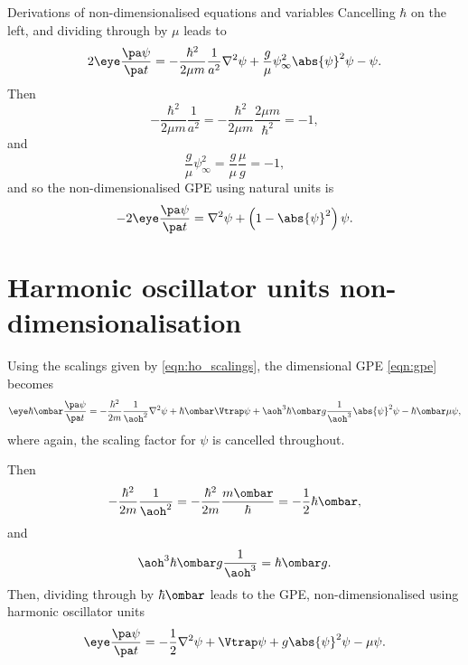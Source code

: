 \begin{chapter}{\label{cha:nondim}Derivations of non-dimensionalised equations
and variables}
  Cancelling $\hbar$ on the left, and dividing through by $\mu$ leads to
  \begin{equation*}
    2\eye \frac{\pa \psi}{\pa t} = -\frac{\hbar^{2}}{2\mu m} \frac{1}{a^{2}}
    \nabla^{2} \psi + \frac{g}{\mu} \psi_{\infty}^{2} \abs{\psi}^{2} \psi -
    \psi.
  \end{equation*}
  Then
  \begin{equation*}
    -\frac{\hbar^{2}}{2\mu m} \frac{1}{a^{2}} = -\frac{\hbar^{2}}{2\mu m}
    \frac{2\mu m}{\hbar^{2}} = -1,
  \end{equation*}
  and
  \begin{equation*}
    \frac{g}{\mu} \psi_{\infty}^{2} = \frac{g}{\mu} \frac{\mu}{g} = -1,
  \end{equation*}
  and so the non-dimensionalised GPE using natural units is
  \begin{equation*}
    -2\eye\frac{\pa \psi}{\pa t} = \nabla^{2}\psi + \left(1 -
    \abs{\psi}^{2}\right)\psi.
  \end{equation*}

  \section{Harmonic oscillator units non-dimensionalisation}
  Using the scalings given by \eqref{eqn:ho_scalings}, the dimensional GPE
  \eqref{eqn:gpe} becomes
  \begin{equation*}
    \eye \hbar \ombar \frac{\pa \psi}{\pa t} = -\frac{\hbar^{2}}{2m}
    \frac{1}{\aoh^{2}} \nabla^{2} \psi + \hbar \ombar \Vtrap \psi + \aoh^{3}
    \hbar \ombar g \frac{1}{\aoh^{3}} \abs{\psi}^{2} \psi - \hbar \ombar \mu
    \psi,
  \end{equation*}
  where again, the scaling factor for $\psi$ is cancelled throughout.

  Then
  \begin{equation*}
    -\frac{\hbar^{2}}{2m} \frac{1}{\aoh^{2}} = -\frac{\hbar^{2}}{2m}
    \frac{m\ombar}{\hbar} = -\frac{1}{2} \hbar \ombar,
  \end{equation*}
  and
  \begin{equation*}
    \aoh^{3} \hbar \ombar g \frac{1}{\aoh^{3}} = \hbar \ombar g.
  \end{equation*}
  Then, dividing through by $\hbar \ombar$ leads to the GPE,
  non-dimensionalised using harmonic oscillator units
  \begin{equation*}
    \eye \frac{\pa \psi}{\pa t} = -\frac{1}{2}\nabla^{2}\psi + \Vtrap\psi +
    g\abs{\psi}^{2}\psi - \mu\psi.
  \end{equation*}


\end{chapter}
